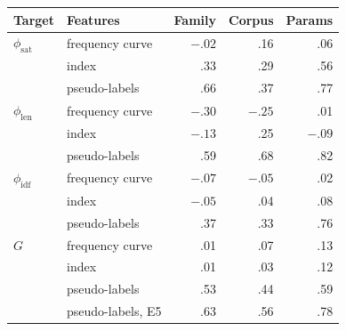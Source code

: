 \begin{tabular}{@{}llrrr@{}}
\toprule
Target & Features & Family & Corpus & Params \\
\midrule
$\phi_{\mathrm{sat}}$ & frequency curve & $-.02$ & .16 & .06 \\
 & index & .33 & .29 & .56 \\
 & pseudo-labels & .66 & .37 & .77 \\
$\phi_{\mathrm{len}}$ & frequency curve & $-.30$ & $-.25$ & .01 \\
 & index & $-.13$ & .25 & $-.09$ \\
 & pseudo-labels & .59 & .68 & .82 \\
$\phi_{\mathrm{idf}}$ & frequency curve & $-.07$ & $-.05$ & .02 \\
 & index & $-.05$ & .04 & .08 \\
 & pseudo-labels & .37 & .33 & .76 \\
$G$ & frequency curve & .01 & .07 & .13 \\
 & index & .01 & .03 & .12 \\
 & pseudo-labels & .53 & .44 & .59 \\
 & pseudo-labels, E5 & .63 & .56 & .78 \\
\bottomrule
\end{tabular}
